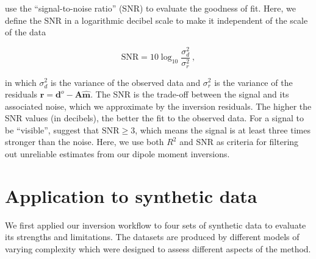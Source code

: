 \citet{CortesOrtuno2021} use the ``signal-to-noise ratio'' (SNR) to evaluate the goodness of fit.
Here, we define the SNR in a logarithmic decibel scale to make it independent of the scale of the data

\begin{equation}
\label{eq_snr}
\text{SNR} = 10 \log_{10}\dfrac{\sigma^2_d}{\sigma^2_r}\ ,
\end{equation}

\noindent
in which $\sigma^2_d$ is the variance of the observed data and $\sigma^2_r$ is the variance of the residuals $\mathbf{r} = \mathbf{d}^o - \mathbf{A}\hat{\mathbf{m}}$.
The SNR is the trade-off between the signal and its associated noise, which we approximate by the inversion residuals.
The higher the SNR values (in decibels), the better the fit to the observed data.
For a signal to be ``visible'', \citet{Strum2014} suggest that $\text{SNR} \ge 3$, which means the signal is at least three times stronger than the noise.
Here, we use both $R^2$ and SNR as criteria for filtering out unreliable estimates from our dipole moment inversions.


\section{Application to synthetic data}

We first applied our inversion workflow to four sets of synthetic data to evaluate its strengths and limitations.
The datasets are produced by different models of varying complexity which were designed to assess different aspects of the method.

